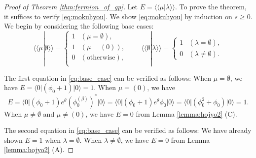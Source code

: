 \documentclass{amsart}
\def\ket#1{\vert #1 \rangle}
\def\bra#1{\langle #1 \vert}
\def\iinner#1#2{\langle\!\langle #1|#2\rangle\!\rangle}
\begin{document}
\begin{proof}[Proof of Theorem \ref{thm:fermion_of_gp}]

Let $E=\iinner{\mu}{\lambda}$.
To prove the theorem, it suffices to verify \eqref{eq:mokuhyou}.
We show \eqref{eq:mokuhyou} by induction on $s\geq 0$.
We begin by considering the following base cases:
\begin{equation}\label{eq:base_case}
\iinner{\mu}{\emptyset}=
\begin{cases}
1 & (\mu=\emptyset),\\
1 & (\mu=(0)),\\
0 & (\text{otherwise}),\\
\end{cases}\qquad
\iinner{\emptyset}{\lambda}
=
\begin{cases}
1 & (\lambda=\emptyset),\\
0 & (\lambda\neq \emptyset).
\end{cases}
\end{equation}

The first equation in \eqref{eq:base_case} can be verified as follows: When $\mu=\emptyset$, we have $E=\bra{0}(\phi_0+1)\ket{0}=1$.
When $\mu=(0)$, we have \[
E=
\bra{0}(\phi_0+1)e^\theta(\phi_0^{(\beta)})^\ast\ket{0}
=\bra{0}(\phi_0+1)e^\theta\phi_0\ket{0}
=\bra{0}(\phi_0^2+\phi_0)\ket{0}=1.
\]
When $\mu\neq \emptyset$ and $\mu\neq(0)$, we have $E=0$ from Lemma \ref{lemma:hojyo2} (C).

The second equation in \eqref{eq:base_case} can be verified as follows: We have already shown $E=1$ when $\lambda=\emptyset$.
When $\lambda\neq \emptyset$, we have $E=0$ from Lemma \ref{lemma:hojyo2} (A).


\end{proof}
\end{document}
